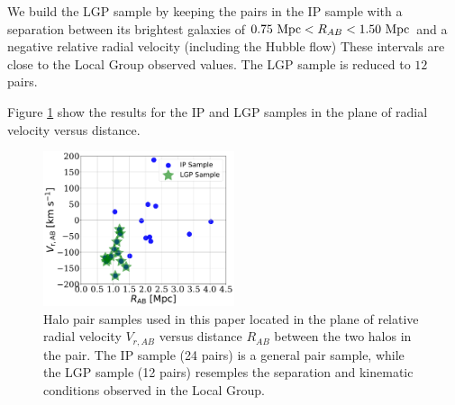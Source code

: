 \documentclass[useAMS,usenatbib,usegraphicx]{mn2e}
\newcommand{\Mpc}{{\ifmmode{{\rm Mpc}}\else{Mpc}\fi}}
\begin{document}
We build the LGP sample by keeping the pairs in the IP sample with
a separation between its brightest galaxies of $0.75\ \Mpc <R_{AB}< 1.50\ \Mpc$
and a negative relative radial velocity (including the Hubble flow) 
These intervals are close to the Local Group observed values.
The LGP sample is reduced to $12$ pairs.

Figure \ref{fig:samples} show the results for the IP and LGP samples
in the plane of radial velocity versus distance.

\begin{figure}
\centering
\includegraphics[width=0.5\textwidth]{v_r_pairs.pdf}
\caption{Halo pair samples used in this paper located in the
  plane of relative radial velocity $V_{r,AB}$ versus 
  distance $R_{AB}$ between the two halos in the pair.
  The IP sample (24 pairs) is a general pair sample, while the LGP
  sample (12 pairs) resemples the separation and kinematic
  conditions observed in the Local Group.} 
\label{fig:samples}
\end{figure}




\end{document}
